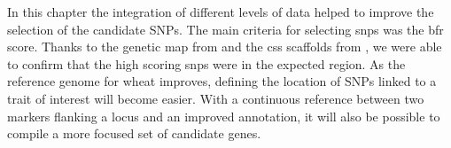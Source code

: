 
In this chapter the integration of different levels of data helped to improve the selection of the candidate SNPs. 
The main criteria for selecting \glspl{snp}  was the \gls{bfr} score.
Thanks to the genetic map from \citet{Wang2014} and the \gls{css} scaffolds from \citet{Mayer2014}, we were able to confirm that the high scoring \glspl{snp} were in the expected region. 
As the reference genome for wheat improves, defining the location of SNPs linked to a trait of interest will become easier. 
With a continuous reference between two markers flanking a locus and an improved annotation, it will also be possible to compile a more focused set of candidate genes.

